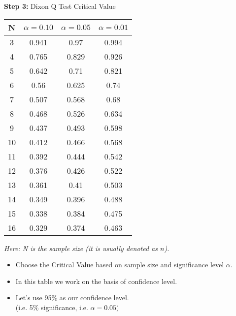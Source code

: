 \documentclass[a4paper,12pt]{article}
\begin{document}
	
	
	
\newpage 
	
	\textbf{Step 3:} Dixon Q Test Critical Value\\ \smallskip
{	
	\LARGE
	\begin{center}
		\begin{tabular}{|c|c|c|c|}\hline
		\phantom{spa}N\phantom{spa}	&	$\alpha=0.10$	&	$\alpha=0.05$	&	$\alpha=0.01$	\\ \hline\hline
		3	&	0.941	&	0.97	&	0.994	\\ \hline
		4	&	0.765	&	0.829	&	0.926	\\ \hline
		5	&	0.642	&	0.71	&	0.821	\\ \hline
		6	&	0.56	&	0.625	&	0.74	\\ \hline
		7	&	0.507	&	0.568	&	0.68	\\ \hline
		8	&	0.468	&	0.526	&	0.634	\\ \hline
		9	&	0.437	&	0.493	&	0.598	\\ \hline
		10	&	0.412	&	0.466	&	0.568	\\ \hline
		11	&	0.392	&	0.444	&	0.542	\\ \hline
		12	&	0.376	&	0.426	&	0.522	\\ \hline
		13	&	0.361	&	0.41	&	0.503	\\ \hline
		14	&	0.349	&	0.396	&	0.488	\\ \hline
		15	&	0.338	&	0.384	&	0.475	\\ \hline
		16	&	0.329	&	0.374	&	0.463	\\ \hline
	\end{tabular}
\end{center}
}
\textit{Here: N is the sample size (\textit{it is usually denoted as $n$}).}




\begin{itemize}
	\item Choose the Critical Value based on sample size and significance level $\alpha$. \smallskip
	\item In this table we work on the basis of confidence level. \smallskip \item Let's use 95\% as our confidence level. \\ (i.e. 5\% significance, i.e. $\alpha=0.05)$ 
	
\end{itemize}
\end{document}
